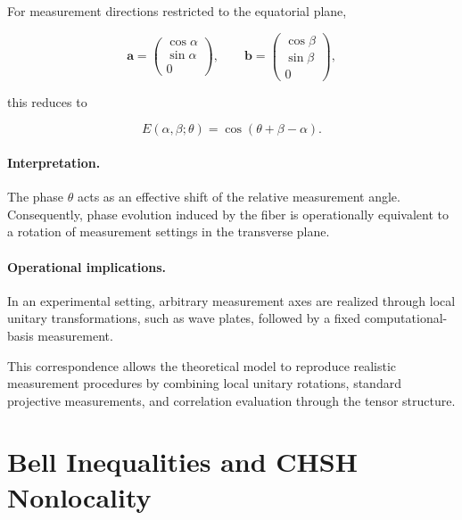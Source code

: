 For measurement directions restricted to the equatorial plane,

\[
\mathbf{a}
=
\begin{pmatrix}
\cos\alpha\\
\sin\alpha\\
0
\end{pmatrix},
\qquad
\mathbf{b}
=
\begin{pmatrix}
\cos\beta\\
\sin\beta\\
0
\end{pmatrix},
\]

this reduces to

\begin{equation}
E(\alpha,\beta;\theta)
=
\cos(\theta + \beta - \alpha).
\label{eq:equatorial_axis_correlation}
\end{equation}

\medskip

\paragraph{Interpretation.}

The phase \( \theta \) acts as an effective shift of the relative measurement angle. Consequently, phase evolution induced by the fiber is operationally equivalent to a rotation of measurement settings in the transverse plane.

\medskip

\paragraph{Operational implications.}

In an experimental setting, arbitrary measurement axes are realized through local unitary transformations, such as wave plates, followed by a fixed computational-basis measurement.

This correspondence allows the theoretical model to reproduce realistic measurement procedures by combining local unitary rotations, standard projective measurements, and correlation evaluation through the tensor structure.


\section{Bell Inequalities and CHSH Nonlocality}

